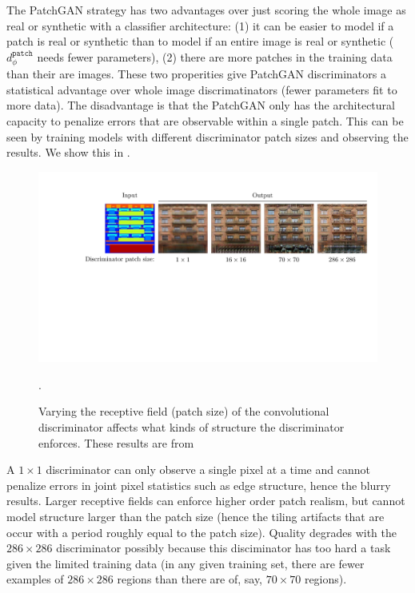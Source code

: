 The PatchGAN strategy has two advantages over just scoring the whole image as real or synthetic with a classifier architecture: (1) it can be easier to model if a patch is real or synthetic than to model if an entire image is real or synthetic ($d_{\phi}^{\texttt{patch}}$ needs fewer parameters), (2) there are more patches in the training data than their are images. These two properities give PatchGAN discriminators a statistical advantage over whole image discrimatinators (fewer parameters fit to more data). The disadvantage is that the PatchGAN only has the architectural capacity to penalize errors that are observable within a single patch. This can be seen by training models with different discriminator patch sizes and observing the results. We show this in \fig{\ref{fig:conditional_generative_models:patchgan_patch_size_variations}}. %
\begin{figure}[h!]
    \centerline{
        \includegraphics[width=1.0\linewidth]{./figures/conditional_generative_models/patchgan_patch_size_variations.pdf}
    }
    \caption{Varying the receptive field (patch size) of the convolutional discriminator affects what kinds of structure the discriminator enforces. These results are from \cite{pix2pix2017}}.
    \label{fig:conditional_generative_models:patchgan_patch_size_variations}
\end{figure}

A $1\times1$ discriminator can only observe a single pixel at a time and cannot penalize errors in joint pixel statistics such as edge structure, hence the blurry results. Larger receptive fields can enforce higher order patch realism, but cannot model structure larger than the patch size (hence the tiling artifacts that are occur with a period roughly equal to the patch size). Quality degrades with the $286\times286$ discriminator possibly because this disciminator has too hard a task given the limited training data (in any given training set, there are fewer examples of $286\times286$ regions than there are of, say, $70\times70$ regions).

